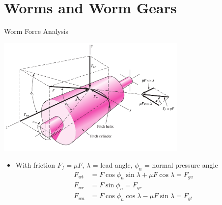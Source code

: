 \documentclass[10pt, svgnames]{beamer}
\begin{document}
\section{Worms and Worm Gears}
\label{worms-and-worm-gears}
\begin{frame}[label={sec:org785c5e6}]{Worm Force Analysis}
\begin{center}
\includegraphics[width=0.7\textwidth]{pictures/worm-gear-forces.png}
\end{center}

\begin{itemize}
\item With friction \(F_{f} = \mu F\), \(\lambda\) = lead angle,
\(\phi_{n}\) = normal pressure angle
\begin{align*}
  F_{wt} &= F \cos \phi_{n} \sin \lambda + \mu F \cos \lambda = F_{ga} \\
  F_{wr} &= F \sin \phi_{n} = F_{gr} \\
  F_{wa} &= F \cos \phi_{n} \cos \lambda - \mu F \sin \lambda = F_{gt}
\end{align*}
\end{itemize}
\end{frame}
\end{document}
